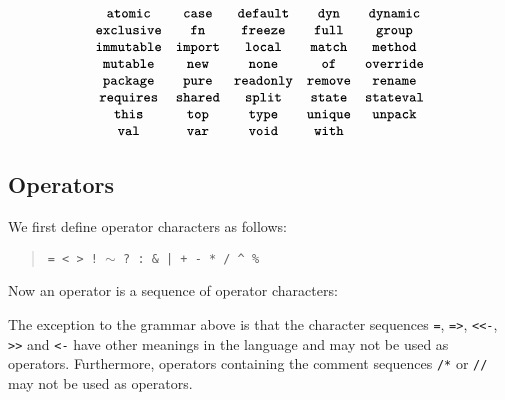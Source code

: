 \begin{quote}
 \oneof 
\end{quote}
\[
  \begin{array}{cccccc}
  \texttt{\textbf{atomic}}
  & \texttt{\textbf{case}} 
  & \texttt{\textbf{default}}
  & \texttt{\textbf{dyn}} 
  & \texttt{\textbf{dynamic}}
  \\
  \texttt{\textbf{exclusive}} 
  & \texttt{\textbf{fn}}
  & \texttt{\textbf{freeze}}
  & \texttt{\textbf{full}} 
  & \texttt{\textbf{group}}  
  \\
  \texttt{\textbf{immutable}}
  & \texttt{\textbf{import}}
  & \texttt{\textbf{local}}
  & \texttt{\textbf{match}}
  & \texttt{\textbf{method}}
  \\
  \texttt{\textbf{mutable}}
  &\texttt{\textbf{new}}
  & \texttt{\textbf{none}}
  & \texttt{\textbf{of}}
  & \texttt{\textbf{override}} 
  \\
  \texttt{\textbf{package}}
  & \texttt{\textbf{pure}}
  & \texttt{\textbf{readonly}}
  & \texttt{\textbf{remove}}
  & \texttt{\textbf{rename}}
  \\
  \texttt{\textbf{requires}}
  &\texttt{\textbf{shared}}
  & \texttt{\textbf{split}}  
  & \texttt{\textbf{state}}
  & \texttt{\textbf{stateval}}
  \\
   \texttt{\textbf{this}}
  & \texttt{\textbf{top}}
  & \texttt{\textbf{type}} 
  & \texttt{\textbf{unique}} 
  & \texttt{\textbf{unpack}}
  \\  \texttt{\textbf{val}}
  &\texttt{\textbf{var}}
  &\texttt{\textbf{void}}
  &\texttt{\textbf{with}}
  \end{array}
\]







\subsection{Operators}

We first define operator characters as follows:

\begin{quote}

 \oneof

 \texttt{= < > ! $\sim$ ? : \& | + - * / \^{} \%}

\end{quote}

Now an operator is a sequence of operator characters:

\begin{quote}


 {}

 {} 

\end{quote}

The exception to the grammar above is that the character sequences
\texttt{=}, \texttt{=>}, \texttt{<{}<-}, \texttt{>{}>} and \texttt{<-} have
other meanings in the language and may not be used as operators.
Furthermore, operators containing the comment sequences \texttt{/*}
or \texttt{//} may not be used as operators.
